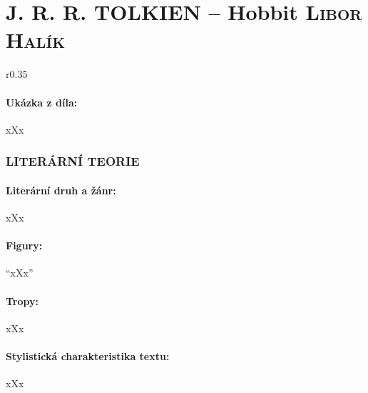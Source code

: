 \documentclass[A4paper]{extarticle} %
\begin{document}
\newpage


\changefontsize{8pt}

\part*{J. R. R. TOLKIEN -- Hobbit {\hfill \normalfont\tiny\textsc{Libor Halík}}}

\noindent\begin{wrapfigure}{r}{0.35\textwidth}
\tiny

\subsection*{Ukázka z díla:}
\setlength{\parindent}{3pt}
xXx
\end{wrapfigure}

\section*{LITERÁRNÍ TEORIE}

\subsection*{Literární druh a žánr:}
\noindent xXx



\subsection*{Figury:}
\noindent 
\enquote{xXx}

\subsection*{Tropy:}
\noindent 
xXx

\subsection*{Stylistická charakteristika textu:}
\noindent 
xXx
\end{document}
